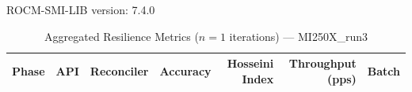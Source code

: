 ROCM-SMI-LIB version: 7.4.0

\begin{table}[htbp]
\caption{Aggregated Resilience Metrics ($n=1$ iterations) --- MI250X_run3}
\begin{tabular}{l l l r r r r}
\hline
Phase & API & Reconciler & Accuracy & Hosseini Index & Throughput (pps) & Batch \\
\hline
\hline
\end{tabular}
\end{table}
